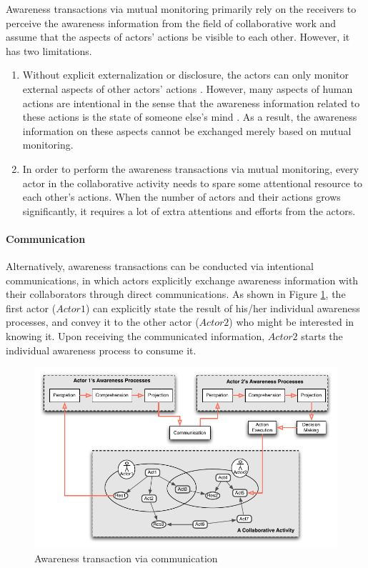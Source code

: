 Awareness transactions via mutual monitoring primarily rely on the receivers to perceive the awareness information from the field of collaborative work and assume that the aspects of actors' actions be visible to each other. However, it has two limitations. 
\begin{enumerate}
	\item Without explicit externalization or disclosure, the actors can only monitor external aspects of other actors' actions \cite{Rittenbruch2007}. However, many aspects of human actions are intentional in the sense that the awareness information related to these actions is the state of someone else's mind \cite{carroll2003a}. As a result, the awareness information on these aspects cannot be exchanged merely based on mutual monitoring.
	\item In order to perform the awareness transactions via mutual monitoring, every actor in the collaborative activity needs to spare some attentional resource to each other's actions. When the number of actors and their actions grows significantly, it requires a lot of extra attentions and efforts from the actors.
\end{enumerate}

\paragraph*{Communication} %
\label{par:communication}
Alternatively, awareness transactions can be conducted via intentional communications, in which actors explicitly exchange awareness information with their collaborators through direct communications. As shown in Figure \ref{fig:trans_communication}, the first actor ($Actor1$) can explicitly state the result of his/her individual awareness processes, and convey it to the other actor ($Actor2$) who might be interested in knowing it. Upon receiving the communicated information, $Actor2$ starts the individual awareness process to consume it. 

\begin{figure}[htbp] %
   \centering
   \includegraphics{trans_communication.pdf} 
   \caption{Awareness transaction via communication}
   \label{fig:trans_communication}
\end{figure}

